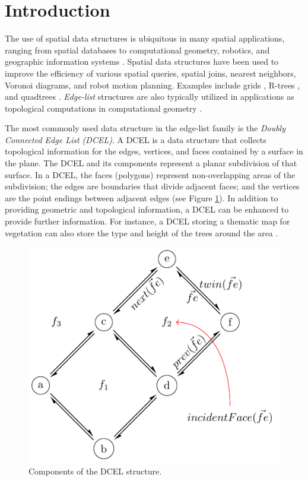 \section{Introduction}

The use of spatial data structures is ubiquitous in many spatial applications, ranging from spatial databases to computational geometry, robotics, and geographic information systems \cite{samet_design_1990}. Spatial data structures have been used to improve the efficiency of various spatial queries, spatial joins, nearest neighbors, Voronoi diagrams, and robot motion planning. Examples include grids \cite{nievergelt_grid_1984}, R-trees \cite{guttman_r-trees_1984, beckmann_r-tree_1990}, and quadtrees \cite{finkel_quadtrees_1974}.  \textit{Edge-list} structures are also typically utilized in applications as topological computations in computational geometry \cite{berg_computational_2008}.

The most commonly used data structure in the edge-list family is the \textit{Doubly Connected Edge List (DCEL)}. A DCEL \cite{muller_finding_1978, preparata_computational_1985} is a data structure that collects topological information for the edges, vertices, and faces contained by a surface in the plane. The DCEL and its components represent a planar subdivision of that surface. In a DCEL, the faces (polygons) represent non-overlapping areas of the subdivision; the edges are boundaries that divide adjacent faces; and the vertices are the point endings between adjacent edges (see Figure \ref{fig:dcel_example}).  In addition to providing geometric and topological information, a DCEL can be enhanced to provide further information. For instance, a DCEL storing a thematic map for vegetation can also store the type and height of the trees around the area \cite{berg_computational_2008}.

\begin{figure}
    \centering
    \includegraphics[width=0.6\linewidth]{chapterSDCEL/dcel_example/dcel_example}
    \caption{Components of the DCEL structure.}\label{fig:dcel_example}
\end{figure}

